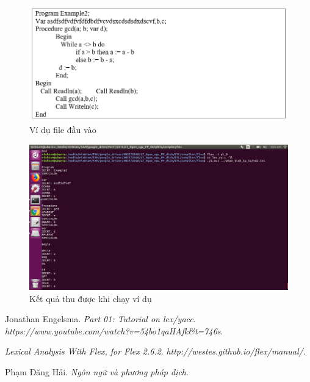 \documentclass[14pt,a4paper]{extreport}
\begin{document}
\begin{figure}
	\centering
	\includegraphics[scale=.6]{chuongtrinhcandich}
	\caption{Ví dụ file đầu vào}
\end{figure}


\begin{figure}
	\centering
	\includegraphics[scale=.39]{ketqua}
	\caption{Kết quả thu được khi chạy ví dụ}
\end{figure}

\begin{thebibliography}{9}
	Jonathan Engelsma.
	\textit{Part 01: Tutorial on lex/yacc}. 
	\textit{https://www.youtube.com/watch?v=54bo1qaHAfk\&t=746s}.
	
	
	\textit{Lexical Analysis With Flex, for Flex 2.6.2}.  
	\textit{http://westes.github.io/flex/manual/}.
	
	
	Phạm Đăng Hải.  
	\textit{Ngôn ngữ và phương pháp dịch}.  

	
	
	
\end{thebibliography}
\end{document}
